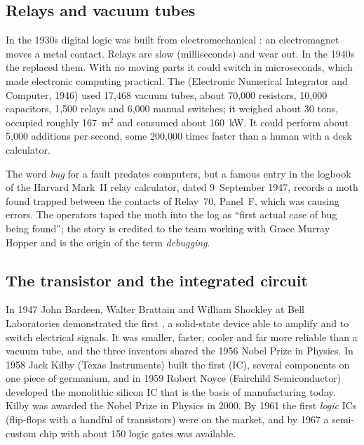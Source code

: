 \subsection{Relays and vacuum tubes}
In the 1930s digital logic was built from electromechanical : an electromagnet moves a metal contact. Relays are slow (milliseconds) and wear out. In the 1940s the  replaced them. With no moving parts it could switch in microseconds, which made electronic computing practical. The  (Electronic Numerical Integrator and Computer, 1946) used 17{,}468 vacuum tubes, about 70{,}000 resistors, 10{,}000 capacitors, 1{,}500 relays and 6{,}000 manual switches; it weighed about 30 tons, occupied roughly 167~m$^2$ and consumed about 160~kW. It could perform about 5{,}000 additions per second, some 200{,}000 times faster than a human with a desk calculator.

\begin{caution}
The word \emph{bug} for a fault predates computers, but a famous entry in the logbook of the Harvard Mark~II relay calculator, dated 9~September 1947, records a moth found trapped between the contacts of Relay~70, Panel~F, which was causing errors. The operators taped the moth into the log as ``first actual case of bug being found''; the story is credited to the team working with Grace Murray Hopper and is the origin of the term \emph{debugging}.
\end{caution}

\subsection{The transistor and the integrated circuit}
In 1947 John Bardeen, Walter Brattain and William Shockley at Bell Laboratories demonstrated the first , a solid-state device able to amplify and to switch electrical signals. It was smaller, faster, cooler and far more reliable than a vacuum tube, and the three inventors shared the 1956 Nobel Prize in Physics. In 1958 Jack Kilby (Texas Instruments) built the first  (IC), several components on one piece of germanium, and in 1959 Robert Noyce (Fairchild Semiconductor) developed the monolithic silicon IC that is the basis of manufacturing today. Kilby was awarded the Nobel Prize in Physics in 2000. By 1961 the first \emph{logic} ICs (flip-flops with a handful of transistors) were on the market, and by 1967 a semi-custom chip with about 150 logic gates was available.


